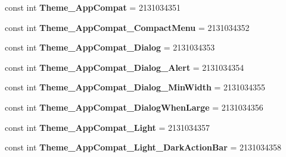 \begin{DoxyCompactItemize}
\item 
\hypertarget{classClient_1_1Droid_1_1Resource_1_1Style_a487a63dfb6fc0e5d11ed6e171b10050c}{}const int {\bfseries Theme\+\_\+\+App\+Compat} = 2131034351\label{classClient_1_1Droid_1_1Resource_1_1Style_a487a63dfb6fc0e5d11ed6e171b10050c}

\item 
\hypertarget{classClient_1_1Droid_1_1Resource_1_1Style_a83aecedaae24d617fe39fd7d0a42f257}{}const int {\bfseries Theme\+\_\+\+App\+Compat\+\_\+\+Compact\+Menu} = 2131034352\label{classClient_1_1Droid_1_1Resource_1_1Style_a83aecedaae24d617fe39fd7d0a42f257}

\item 
\hypertarget{classClient_1_1Droid_1_1Resource_1_1Style_a5ce9e472616ad0e492f8aec420b72a73}{}const int {\bfseries Theme\+\_\+\+App\+Compat\+\_\+\+Dialog} = 2131034353\label{classClient_1_1Droid_1_1Resource_1_1Style_a5ce9e472616ad0e492f8aec420b72a73}

\item 
\hypertarget{classClient_1_1Droid_1_1Resource_1_1Style_a8c32892974c07295a6e17bbef31b0ae7}{}const int {\bfseries Theme\+\_\+\+App\+Compat\+\_\+\+Dialog\+\_\+\+Alert} = 2131034354\label{classClient_1_1Droid_1_1Resource_1_1Style_a8c32892974c07295a6e17bbef31b0ae7}

\item 
\hypertarget{classClient_1_1Droid_1_1Resource_1_1Style_a5bee076f56dc6171b7e8a1d7c9475cb7}{}const int {\bfseries Theme\+\_\+\+App\+Compat\+\_\+\+Dialog\+\_\+\+Min\+Width} = 2131034355\label{classClient_1_1Droid_1_1Resource_1_1Style_a5bee076f56dc6171b7e8a1d7c9475cb7}

\item 
\hypertarget{classClient_1_1Droid_1_1Resource_1_1Style_a5cf6e3787e6b9d53648fcb9f24933b62}{}const int {\bfseries Theme\+\_\+\+App\+Compat\+\_\+\+Dialog\+When\+Large} = 2131034356\label{classClient_1_1Droid_1_1Resource_1_1Style_a5cf6e3787e6b9d53648fcb9f24933b62}

\item 
\hypertarget{classClient_1_1Droid_1_1Resource_1_1Style_af6d172770a7faa9de210b13108dffa0d}{}const int {\bfseries Theme\+\_\+\+App\+Compat\+\_\+\+Light} = 2131034357\label{classClient_1_1Droid_1_1Resource_1_1Style_af6d172770a7faa9de210b13108dffa0d}

\item 
\hypertarget{classClient_1_1Droid_1_1Resource_1_1Style_abd87908b12560299ea04b4d03e843670}{}const int {\bfseries Theme\+\_\+\+App\+Compat\+\_\+\+Light\+\_\+\+Dark\+Action\+Bar} = 2131034358\label{classClient_1_1Droid_1_1Resource_1_1Style_abd87908b12560299ea04b4d03e843670}


\end{DoxyCompactItemize}
